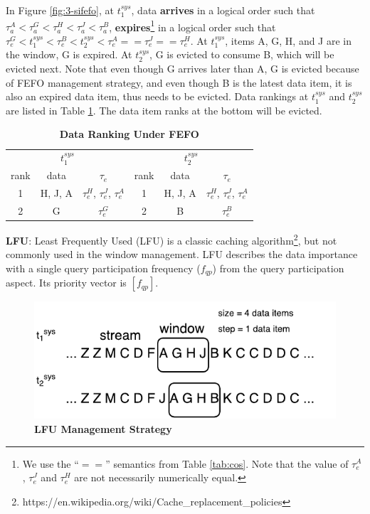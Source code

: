 In Figure \ref{fig:3-sifefo}, at $t^{sys}_{1}$, data \textbf{arrives} in a logical order such that $\tau^{A}_{a} < \tau^{G}_{a} < \tau^{H}_{a} < \tau^{J}_{a} < \tau^{B}_{a}$, \textbf{expires}\footnote{We use the ``$==$'' semantics from Table \ref{tab:cos}. Note that the value of $\tau^{A}_{e}$, $\tau^{J}_{e}$ and $\tau^{H}_{e}$ are not necessarily numerically equal.} in a logical order such that $\tau^{G}_{e} < t^{sys}_{1} < \tau^{B}_{e} < t^{sys}_{2} < \tau^{A}_{e} == \tau^{J}_{e} == \tau^{H}_{e}$.
At $t^{sys}_{1}$, items A, G, H, and J are in the window, G is expired.
At $t^{sys}_{2}$, G is evicted to consume B, which will be evicted next. 
Note that even though G arrives later than A, G is evicted because of FEFO management strategy,
and even though B is the latest data item, it is also an expired data item, thus needs to be evicted. 
Data rankings at $t^{sys}_{1}$ and $t^{sys}_{2}$ are listed in Table \ref{tab:fefo}. 
The data item ranks at the bottom will be evicted. 

\begin{table}[!htbp]
\centering
\caption{\textbf{Data Ranking Under FEFO}}
\label{tab:fefo}
\begin{tabular}{|c|c|c||c|c|c|}
\hline
\multicolumn{3}{|c||}{$t^{sys}_{1}$} & \multicolumn{3}{c|}{$t^{sys}_{2}$} \\ \hhline{|===#===|}
rank & data & $\tau_{e}$ & rank & data & $\tau_{e}$ \\ \hhline{|=|=|=#=|=|=|}
1 & H, J, A & $\tau^{H}_{e}$, $\tau^{J}_{e}$, $\tau^{A}_{e}$ & 1 & H, J, A & $\tau^{H}_{e}$, $\tau^{J}_{e}$, $\tau^{A}_{e}$ \\ \hline
2 & G & $\tau^{G}_{e}$ & 2 & B & $\tau^{B}_{e}$ \\ \hline
\end{tabular}
\end{table}

\textbf{LFU}:
Least Frequently Used (LFU) is a classic caching algorithm\footnote{https://en.wikipedia.org/wiki/Cache\_replacement\_policies}, but not commonly used in the window management.
LFU describes the data importance with a single query participation frequency ($f_{qp}$) from the query participation aspect. 
Its priority vector is $[f_{qp}]$.

\begin{figure}[!htbp]
	\centering
    \includegraphics[width=5in]{img/3-silfu.pdf}
    \caption{\textbf{LFU Management Strategy}}
    \label{fig:3-silfu}
\end{figure}

